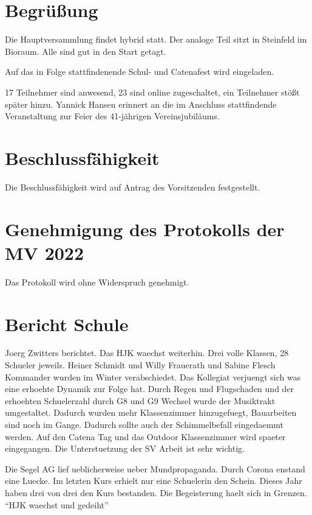 \documentclass[a4paper, 11pt]{article}
\begin{document}
\newpage

\section*{Begrüßung}

Die Hauptversammlung findet hybrid statt. Der analoge Teil sitzt in Steinfeld im Bioraum.
Alle sind gut in den Start getagt.

Auf das in Folge stattfindenende Schul- und Catenafest wird eingeladen.




17 Teilnehmer sind anwesend, 23 sind online zugeschaltet, ein Teilnehmer stößt später hinzu.
Yannick Hansen erinnert an die im Anschluss stattfindende Veranstaltung zur Feier des 41-jährigen Vereinsjubiläums.



\section*{Beschlussfähigkeit}

Die Beschlussfähigkeit wird auf Antrag des Vorsitzenden festgestellt.

\section*{Genehmigung des Protokolls der MV 2022}

Das Protokoll wird ohne Widerspruch genehmigt.

\section*{Bericht Schule}

Joerg Zwitters berichtet. Das HJK waechst weiterhin. Drei volle Klassen, 28 Schueler jeweils.
Heiner Schmidt und Willy Frauerath und Sabine Flesch Kommander wurden im Winter verabschiedet.
Das Kollegiat verjuengt sich was eine erhoehte Dynamik zur Folge hat.
Durch Regen und Flugschaden und der erhoehten Schuelerzahl durch G8 und G9 Wechsel wurde der Musiktrakt umgestaltet.
Dadurch wurden mehr Klassenzimmer hinzugefuegt, Bauarbeiten sind noch im Gange.
Dadurch sollte auch der Schimmelbefall eingedaemmt werden.
Auf den Catena Tag und das Outdoor Klassenzimmer wird spaeter eingegangen.
Die Unterstuetzung der SV Arbeit ist sehr wichtig.

Die Segel AG lief ueblicherweise ueber Mundpropaganda. Durch Corona enstand eine Luecke.
Im letzten Kurs erhielt nur eine Schuelerin den Schein.
Dieses Jahr haben drei von drei den Kurs bestanden. Die Begeisterung haelt sich in Grenzen.
\enquote{HJK waechst und gedeiht}
\end{document}
